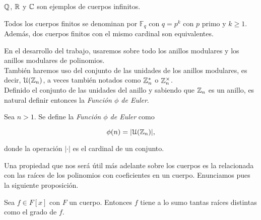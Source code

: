 \begin{ejemplo}
	$\mathbb{Q}$, $\mathbb{R}$ y $\mathbb{C}$ son ejemplos de cuerpos infinitos.
\end{ejemplo}

\begin{ejemplo}
	Todos los cuerpos finitos se denominan por $\mathbb{F}_q$ con $q = p^k$ con $p$ primo y $k \geq 1$. Además, dos cuerpos finitos con el mismo cardinal son equivalentes.
\end{ejemplo}

En el desarrollo del trabajo, usaremos sobre todo los anillos modulares y los anillos modulares de polinomios.\\

También haremos uso del conjunto de las unidades de los anillos modulares, es decir, $\mathcal{U}(\mathbb{Z}_n)$, a veces también notados como $\mathbb{Z}_n^*$ o $\mathbb{Z}_n^\times$.\\

Definido el conjunto de las unidades del anillo y sabiendo que $\mathbb{Z}_n$ es un anillo, es natural definir entonces la \textit{Función $\phi$ de Euler}.

\begin{definicion}\label{funcion_phi_de_euler}
	Sea $n > 1$. Se define la \textit{Función $\phi$ de Euler} como
	
	\begin{equation}
	\phi(n) = |\mathcal{U}(\mathbb{Z}_n)|,
	\end{equation}
	
	donde la operación $|\cdot|$ es el cardinal de un conjunto.
\end{definicion}

Una propiedad que nos será útil más adelante sobre los cuerpos es la relacionada con las raíces de los polinomios con coeficientes en un cuerpo. Enunciamos pues la siguiente proposición.

\begin{proposicion}\label{raices_en_cuerpos}
	Sea $f \in F[x]$ con $F$ un cuerpo. Entonces $f$ tiene a lo sumo tantas raíces distintas como el grado de $f$.
\end{proposicion}

